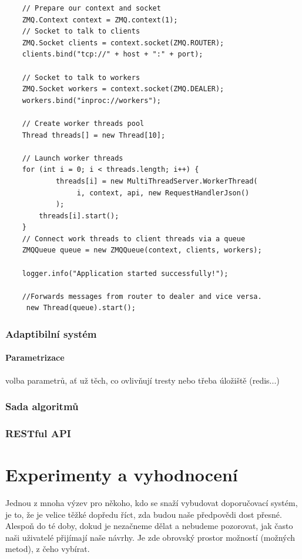 \documentclass[thesis=M,czech]{FITthesis}[2014/05/07]
\begin{document}
\begin{verbatim}
    // Prepare our context and socket
    ZMQ.Context context = ZMQ.context(1);
    // Socket to talk to clients
    ZMQ.Socket clients = context.socket(ZMQ.ROUTER);
    clients.bind("tcp://" + host + ":" + port);

    // Socket to talk to workers
    ZMQ.Socket workers = context.socket(ZMQ.DEALER);
    workers.bind("inproc://workers");

    // Create worker threads pool
    Thread threads[] = new Thread[10];

    // Launch worker threads
    for (int i = 0; i < threads.length; i++) {
    		threads[i] = new MultiThreadServer.WorkerThread(
    		     i, context, api, new RequestHandlerJson()
    		);
        threads[i].start();
    }
    // Connect work threads to client threads via a queue
    ZMQQueue queue = new ZMQQueue(context, clients, workers);

    logger.info("Application started successfully!");

    //Forwards messages from router to dealer and vice versa.
     new Thread(queue).start();
\end{verbatim}

\subsection{Adaptibilní systém}
\subsubsection{Parametrizace}
volba parametrů, ať už těch, co ovlivňují tresty nebo třeba úložiště (redis...)

\subsection{Sada algoritmů}
\label{sec:alg}

\subsection{RESTful API}

\chapter{Experimenty a vyhodnocení}
\label{chap:tests}

Jednou z mnoha výzev pro někoho, kdo se snaží vybudovat doporučovací systém, je to, že je velice těžké dopředu říct, zda budou naše předpovědi dost přesné. Alespoň do té doby, dokud je nezačneme dělat a nebudeme pozorovat, jak často naši uživatelé přijímají naše návrhy. Je zde obrovský prostor možností (možných metod), z čeho vybírat. 
\end{document}
